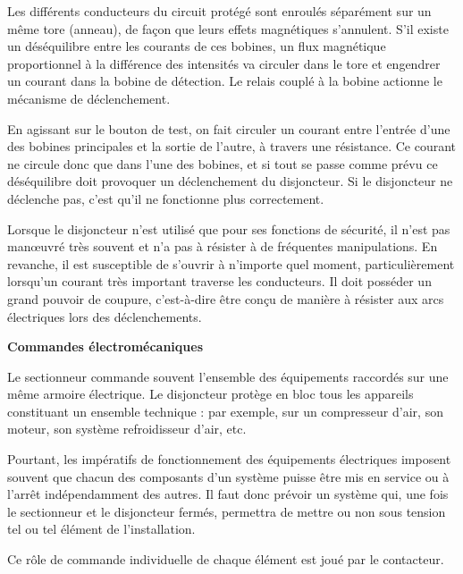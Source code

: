 Les différents conducteurs du circuit protégé sont enroulés séparément sur un même tore 
(anneau), de façon que leurs effets magnétiques s’annulent. S’il existe un déséquilibre entre les courants de ces bobines, un flux magnétique proportionnel à la différence des intensités va circuler dans le tore et engendrer un courant dans la bobine de détection. Le relais couplé à la bobine actionne le mécanisme de déclenchement.
\vspace{0.3cm}

En agissant sur le bouton de test, on fait circuler un courant entre l’entrée d’une des bobines principales et la sortie de l’autre, à travers une résistance. Ce courant ne circule donc que dans l’une des bobines, et si tout se passe comme prévu ce déséquilibre doit provoquer un déclenchement du disjoncteur. Si le disjoncteur ne déclenche pas, c’est qu’il ne fonctionne plus correctement.
\vspace{0.3cm}

Lorsque le disjoncteur n’est utilisé que pour ses fonctions de sécurité, il n’est pas manœuvré très souvent et n’a pas à résister à de fréquentes manipulations. En revanche, il est susceptible de s’ouvrir à n’importe quel moment, particulièrement lorsqu’un courant très important traverse les conducteurs. Il doit posséder un grand pouvoir de coupure, c’est-à-dire être conçu de manière à résister aux arcs électriques lors des déclenchements.


\vspace{0.3cm}
\textbf{Commandes électromécaniques}
\vspace{0.3cm}

Le sectionneur commande souvent l’ensemble des équipements raccordés sur une même armoire électrique. Le disjoncteur protège en bloc tous les appareils constituant un ensemble technique : par exemple, sur un compresseur d’air, son moteur, son système refroidisseur d’air, etc.
\vspace{0.3cm}

Pourtant, les impératifs de fonctionnement des équipements électriques imposent souvent que chacun des composants d’un système puisse être mis en service ou à l’arrêt indépendamment des autres. Il faut donc prévoir un système qui, une fois le sectionneur et le disjoncteur fermés, permettra de mettre ou non sous tension tel ou tel élément de l’installation.
\vspace{0.3cm}

Ce rôle de commande individuelle de chaque élément est joué par le contacteur.


